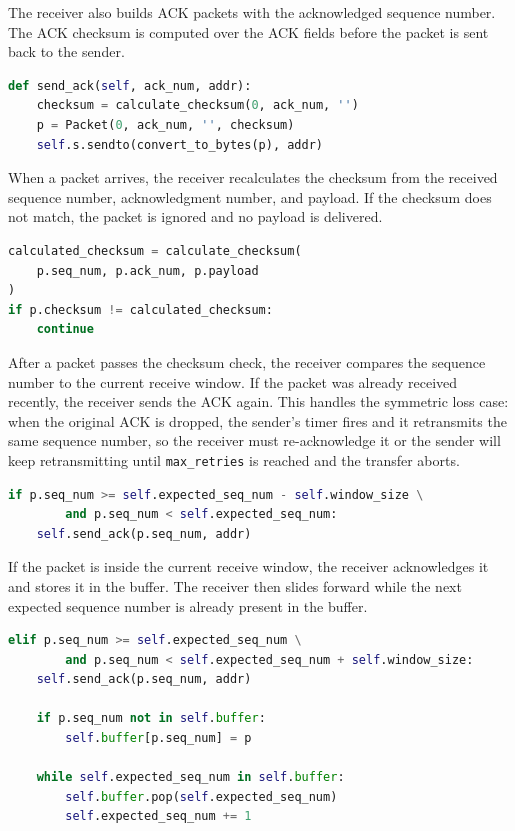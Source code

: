 \documentclass[conference]{IEEEtran}
\begin{document}
The receiver also builds ACK packets with the acknowledged sequence number. The
ACK checksum is computed over the ACK fields before the packet is sent back to
the sender.

\begin{lstlisting}[language=Python]
def send_ack(self, ack_num, addr):
    checksum = calculate_checksum(0, ack_num, '')
    p = Packet(0, ack_num, '', checksum)
    self.s.sendto(convert_to_bytes(p), addr)
\end{lstlisting}

When a packet arrives, the receiver recalculates the checksum from the received
sequence number, acknowledgment number, and payload. If the checksum does not
match, the packet is ignored and no payload is delivered.

\begin{lstlisting}[language=Python]
calculated_checksum = calculate_checksum(
    p.seq_num, p.ack_num, p.payload
)
if p.checksum != calculated_checksum:
    continue
\end{lstlisting}

After a packet passes the checksum check, the receiver compares the sequence
number to the current receive window. If the packet was already received
recently, the receiver sends the ACK again. This handles the symmetric loss
case: when the original ACK is dropped, the sender's timer fires and it
retransmits the same sequence number, so the receiver must re-acknowledge it
or the sender will keep retransmitting until \texttt{max\_retries} is reached
and the transfer aborts.

\begin{lstlisting}[language=Python]
if p.seq_num >= self.expected_seq_num - self.window_size \
        and p.seq_num < self.expected_seq_num:
    self.send_ack(p.seq_num, addr)
\end{lstlisting}

If the packet is inside the current receive window, the receiver acknowledges it
and stores it in the buffer. The receiver then slides forward while the next
expected sequence number is already present in the buffer.

\begin{lstlisting}[language=Python]
elif p.seq_num >= self.expected_seq_num \
        and p.seq_num < self.expected_seq_num + self.window_size:
    self.send_ack(p.seq_num, addr)

    if p.seq_num not in self.buffer:
        self.buffer[p.seq_num] = p

    while self.expected_seq_num in self.buffer:
        self.buffer.pop(self.expected_seq_num)
        self.expected_seq_num += 1
\end{lstlisting}
\end{document}
